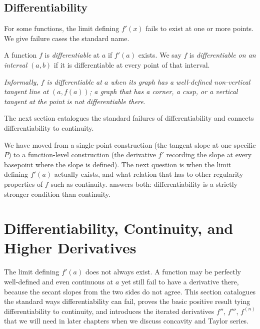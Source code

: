 \subsection{Differentiability}

For some functions, the limit defining \(f'(x)\) fails to exist at one or more points. We give failure cases the standard name.

\begin{definition}\label{def:differentiable}
A function \(f\) is \emph{differentiable} at \(a\) if \(f'(a)\) exists. We say \(f\) is \emph{differentiable on an interval} \((a, b)\) if it is differentiable at every point of that interval.

\emph{Informally, \(f\) is differentiable at \(a\) when its graph has a well-defined non-vertical tangent line at \((a, f(a))\); a graph that has a corner, a cusp, or a vertical tangent at the point is not differentiable there.}
\end{definition}

The next section catalogues the standard failures of differentiability and connects differentiability to continuity.

We have moved from a single-point construction (the tangent slope at one specific \(P\)) to a function-level construction (the derivative \(f'\) recording the slope at every basepoint where the slope is defined). The next question is when the limit defining \(f'(a)\) actually exists, and what relation that has to other regularity properties of \(f\) such as continuity.  answers both: differentiability is a strictly stronger condition than continuity.

\section{Differentiability, Continuity, and Higher Derivatives}\label{sec:differentiability-continuity}

The limit defining \(f'(a)\) does not always exist. A function may be perfectly well-defined and even continuous at \(a\) yet still fail to have a derivative there, because the secant slopes from the two sides do not agree. This section catalogues the standard ways differentiability can fail, proves the basic positive result tying differentiability to continuity, and introduces the iterated derivatives \(f''\), \(f'''\), \(f^{(n)}\) that we will need in later chapters when we discuss concavity and Taylor series.

